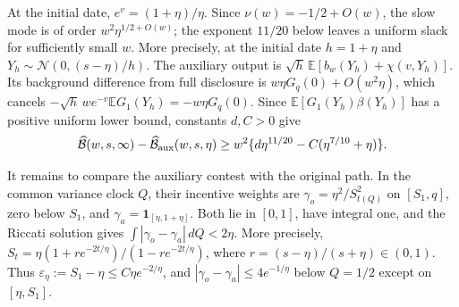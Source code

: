 \documentclass[mnsc]{informs3}
\begin{document}
\begin{APPENDICES}
{At the initial date, $e^v=(1+\eta)/\eta$. Since
$\nu(w)=-1/2+O(w)$, the slow mode is of order
$w^2\eta^{1/2+O(w)}$; the exponent $11/20$ below leaves a uniform slack
for sufficiently small $w$. More precisely, at the initial date
$h=1+\eta$ and
$Y_h\sim\mathcal N(0,(s-\eta)/h)$.
The auxiliary output is $\sqrt h\,\mathbb E[b_w(Y_h)+\chi(v,Y_h)]$.
Its background difference from full disclosure is
$w\eta G_q(0)+O(w^2\eta)$, which cancels
$-\sqrt h\,we^{-v}\mathbb E G_1(Y_h)=-w\eta G_q(0)$.
Since $\mathbb E[G_1(Y_h)\beta(Y_h)]$ has a positive uniform
lower bound, constants $d,C>0$ give
\[
\widehat{\mathcal B}(w,s,\infty)-\widehat{\mathcal B}_{\rm aux}(w,s,\eta)
\geq w^2\{d\eta^{11/20}-C(\eta^{7/10}+\eta)\}.
\]

It remains to compare the auxiliary contest with the original path.
In the common variance clock $Q$, their incentive weights are
$\gamma_o=\eta^2/S_{t(Q)}^2$ on $[S_1,q]$, zero below $S_1$,
and $\gamma_a=\mathbf1_{[\eta,1+\eta]}$.
Both lie in $[0,1]$, have integral one, and the Riccati solution gives
$\int|\gamma_o-\gamma_a|\,dQ<2\eta$.
More precisely, $S_t=\eta(1+r e^{-2t/\eta})/(1-r e^{-2t/\eta})$,
where $r=(s-\eta)/(s+\eta)\in(0,1)$.
Thus $\varepsilon_\eta:=S_1-\eta\leq C\eta e^{-2/\eta}$, and
$|\gamma_o-\gamma_a|\leq4e^{-1/\eta}$ below $Q=1/2$
except on $[\eta,S_1]$.

}
\end{APPENDICES}
\end{document}
